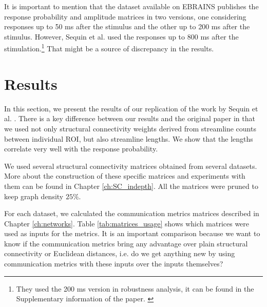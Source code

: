 It is important to mention that the dataset available on EBRAINS publishes the response probability and amplitude matrices in two versions, one considering responses up to 50 ms after the stimulus and the other up to 200 ms after the stimulus. However, Sequin et al. used the responses up to 800 ms after the stimulation.\footnote{They used the 200 ms version in robustness analysis, it can be found in the Supplementary information of the paper. \cite{seguin_communication_2023} } That might be a source of discrepancy in the results.

\section{Results}\label{sec:ftract_results}

In this section, we present the results of our replication of the work by Sequin et al. \cite{seguin_communication_2023}. There is a key difference between our results and the original paper in that we used not only structural connectivity weights derived from streamline counts between individual ROI, but also streamline lengths. We show that the lengths correlate very well with the response probability.

We used several structural connectivity matrices obtained from several datasets. More about the construction of these specific matrices and experiments with them can be found in Chapter \ref{ch:SC_indepth}. All the matrices were pruned to keep graph density $25\%$.

For each dataset, we calculated the communication metrics matrices described in Chapter \ref{ch:networks}. Table \ref{tab:matrices_usage} shows which matrices were used as inputs for the metrics. It is an important comparison because we want to know if the communication metrics bring any advantage over plain structural connectivity or Euclidean distances, i.e. do we get anything new by using communication metrics with these inputs over the inputs themselves? 

